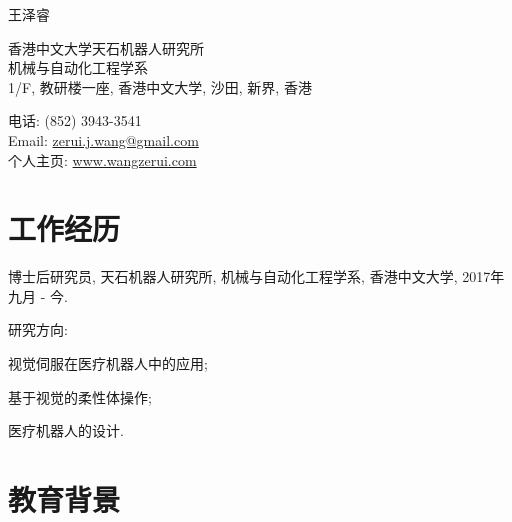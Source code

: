 \documentclass[10pt,letterpaper]{article}
\renewcommand\emph[1]{%
  {#1}
}
\def\name{王泽睿}
\renewenvironment{itemize}{
\begin{list}{}{
    \setlength{\leftmargin}{1.5em}
    \setlength{\itemsep}{0.25em}
    \setlength{\parskip}{0pt}
    \setlength{\parsep}{0.25em}
    }
    }{
\end{list}
}
\begin{document}
{\huge \name}


\bigskip

\begin{minipage}[t]{0.595\textwidth}
    香港中文大学天石机器人研究所 \\
    机械与自动化工程学系 \\
    1/F, 教研楼一座, 香港中文大学, 沙田, 新界, 香港
\end{minipage}
\begin{minipage}[t]{0.395\textwidth}
    电话: (852) 3943-3541 \\
    Email: \href{mailto:zerui.j.wang@gmail.com}{zerui.j.wang@gmail.com} \\
    个人主页: \href{http://www.wangzerui.com/}{www.wangzerui.com}
\end{minipage}

\section*{工作经历}

\begin{itemize}
    \item 博士后研究员, 天石机器人研究所, 机械与自动化工程学系, 香港中文大学, 2017年九月 - 今.
    \begin{itemize}
        \item \emph{研究方向:}
        \begin{itemize}
            \item 视觉伺服在医疗机器人中的应用;
            \item 基于视觉的柔性体操作;
            \item 医疗机器人的设计.
        \end{itemize}
    \end{itemize}
\end{itemize}

\section*{教育背景}
\end{document}
